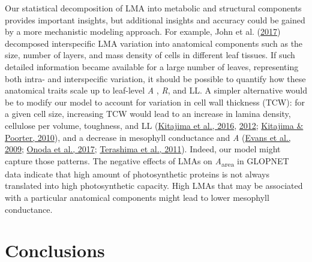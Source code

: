 \documentclass[
  12pt,
  a4paper,
,tablecaptionabove
]{scrartcl}
\begin{document}
Our statistical decomposition of LMA into metabolic and structural
components provides important insights, but additional insights and
accuracy could be gained by a more mechanistic modeling approach. For
example, John et al. (\protect\hyperlink{ref-John2017}{2017}) decomposed
interspecific LMA variation into anatomical components such as the size,
number of layers, and mass density of cells in different leaf tissues.
If such detailed information became available for a large number of
leaves, representing both intra- and interspecific variation, it should
be possible to quantify how these anatomical traits scale up to
leaf-level \emph{A} , \emph{R}, and LL. A simpler alternative would be
to modify our model to account for variation in cell wall thickness
(TCW): for a given cell size, increasing TCW would lead to an increase
in lamina density, cellulose per volume, toughness, and LL
(\protect\hyperlink{ref-Kitajima2016}{Kitajima et al., 2016},
\protect\hyperlink{ref-Kitajima2012}{2012};
\protect\hyperlink{ref-Kitajima2010}{Kitajima \& Poorter, 2010}), and a
decrease in mesophyll conductance and \emph{A}
(\protect\hyperlink{ref-Evans2009}{Evans et al., 2009};
\protect\hyperlink{ref-Onoda2017}{Onoda et al., 2017};
\protect\hyperlink{ref-Terashima2011}{Terashima et al., 2011}). Indeed,
our model might capture those patterns. The negative effects of LMAs on
\emph{A}\textsubscript{area} in GLOPNET data indicate that high amount
of photosynthetic proteins is not always translated into high
photosynthetic capacity. High LMAs that may be associated with a
particular anatomical components might lead to lower mesophyll
conductance.

\hypertarget{conclusions}{%
\section{Conclusions}\label{conclusions}}
\end{document}
